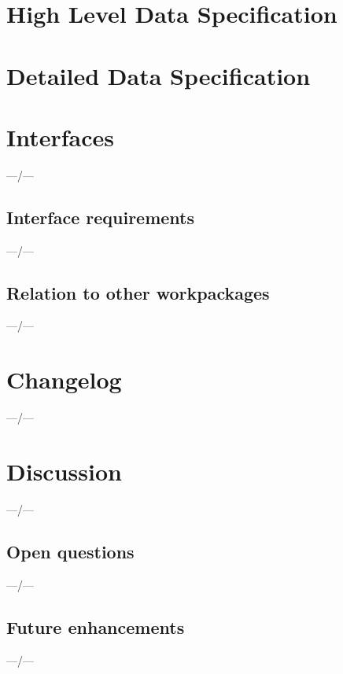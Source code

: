 \documentclass[a4paper,10pt,bibtotoc]{scrartcl}
\begin{document}

\section{High Level Data Specification}
\label{sec:structure}



\section{Detailed Data Specification}



\section{Interfaces}
\label{sec:interfaces}

---/---

\subsection{Interface requirements}

---/---

\subsection{Relation to other workpackages}

---/---


\section{Changelog}
\label{sec:changelog}

---/---


\section{Discussion}
\label{sec:discussion}

---/---

\subsection{Open questions}
\label{sec:open-questions}

---/---

\subsection{Future enhancements}
\label{sec:future-enhancements}

---/---

\end{document}
